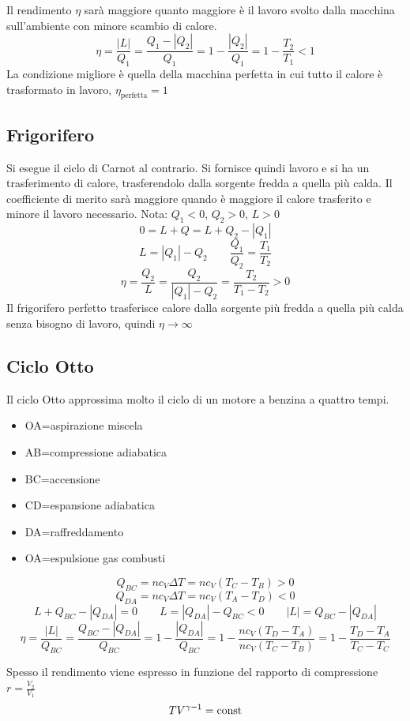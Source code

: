 Il rendimento $\eta$ sarà maggiore quanto maggiore è il lavoro svolto dalla macchina sull'ambiente con minore scambio di calore.
\[\eta=\frac{|L|}{Q_1}=\frac{Q_1-|Q_2|}{Q_1}=1-\frac{|Q_2|}{Q_1}=1-\frac{T_2}{T_1}<1\]
La condizione migliore è quella della macchina perfetta in cui tutto il calore è trasformato in lavoro, $\eta_\text{perfetta}= 1$

\subsection{Frigorifero}
Si esegue il ciclo di Carnot al contrario. Si fornisce quindi lavoro e si ha un trasferimento di calore, trasferendolo dalla sorgente fredda a quella più calda.
Il coefficiente di merito sarà maggiore quando è maggiore il calore trasferito e minore il lavoro necessario.
Nota: $Q_1<0$, $Q_2>0$, $L>0$
\[0=L+Q=L+Q_2-|Q_1|\]
\[L=|Q_1|-Q_2\qquad\frac{Q_1}{Q_2}=\frac{T_1}{T_2}\]
\[\eta=\frac{Q_2}{L}=\frac{Q_2}{|Q_1|-Q_2}=\frac{T_2}{T_1-T_2}>0\]
Il frigorifero perfetto trasferisce calore dalla sorgente più fredda a quella più calda senza bisogno di lavoro, quindi $\eta\rightarrow\infty$

\subsection{Ciclo Otto}
Il ciclo Otto approssima molto il ciclo di un motore a benzina a quattro tempi.
\begin{itemize}
   \item[] OA=aspirazione miscela
   \item[] AB=compressione adiabatica
   \item[] BC=accensione
   \item[] CD=espansione adiabatica
   \item[] DA=raffreddamento
   \item[] OA=espulsione gas combusti
\end{itemize}

\[Q_{BC}=nc_V\Delta T=nc_V(T_C-T_B)>0\]
\[Q_{DA}=nc_V\Delta T=nc_V(T_A-T_D)<0\]
\[L+Q_{BC}-|Q_{DA}|=0 \qquad L=|Q_{DA}|-Q_{BC}<0\qquad |L|=Q_{BC}-|Q_{DA}|\]
\[\eta=\frac{|L|}{Q_{BC}}=\frac{Q_{BC}-|Q_{DA}|}{Q_{BC}}=1-\frac{|Q_{DA}|}{Q_{BC}}=1-\frac{nc_V(T_D-T_A)}{nc_V(T_C-T_B)}=1-\frac{T_D-T_A}{T_C-T_C}\]

Spesso il rendimento viene espresso in funzione del rapporto di compressione $r=\frac{V_2}{V_1}$
\[TV^{\gamma-1}=\text{const}\]

